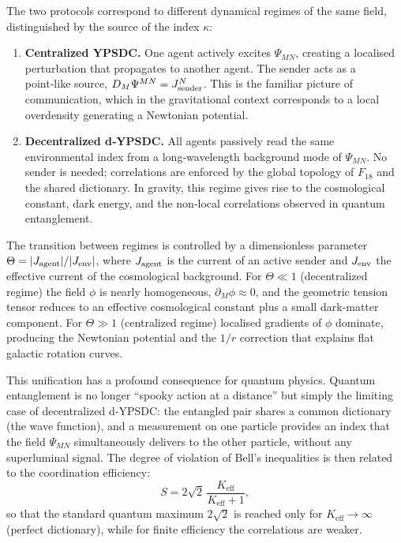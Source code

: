 \documentclass[12pt,a4paper]{article}
\begin{document}
	The two protocols correspond to different dynamical regimes of the same field,
	distinguished by the source of the index $\kappa$:
	\begin{enumerate}[leftmargin=*]
		\item \textbf{Centralized YPSDC.} One agent actively excites $\Psi_{MN}$,
		creating a localised perturbation that propagates to another agent. The
		sender acts as a point‑like source, $D_M\Psi^{MN} = J^N_{\rm sender}$.
		This is the familiar picture of communication, which in the gravitational
		context corresponds to a local overdensity generating a Newtonian potential.
		\item \textbf{Decentralized d‑YPSDC.} All agents passively read the same
		environmental index from a long‑wavelength background mode of $\Psi_{MN}$.
		No sender is needed; correlations are enforced by the global topology of
		$F_{18}$ and the shared dictionary. In gravity, this regime gives rise to
		the cosmological constant, dark energy, and the non‑local correlations
		observed in quantum entanglement.
	\end{enumerate}
	
	The transition between regimes is controlled by a dimensionless parameter
	$\Theta = |J_{\rm agent}| / |J_{\rm env}|$, where $J_{\rm agent}$ is the
	current of an active sender and $J_{\rm env}$ the effective current of the
	cosmological background. For $\Theta\ll1$ (decentralized regime) the field
	$\phi$ is nearly homogeneous, $\partial_M\phi\approx0$, and the geometric
	tension tensor reduces to an effective cosmological constant plus a small
	dark‑matter component. For $\Theta\gg1$ (centralized regime) localised
	gradients of $\phi$ dominate, producing the Newtonian potential and the
	$1/r$ correction that explains flat galactic rotation curves.
	
	This unification has a profound consequence for quantum physics.
	Quantum entanglement is no longer “spooky action at a distance” but simply
	the limiting case of decentralized d‑YPSDC: the entangled pair shares a
	common dictionary (the wave function), and a measurement on one particle
	provides an index that the field $\Psi_{MN}$ simultaneously delivers to the
	other particle, without any superluminal signal. The degree of violation of
	Bell’s inequalities is then related to the coordination efficiency:
	\begin{equation}
		S = 2\sqrt{2}\,\frac{K_{\mathrm{eff}}}{K_{\mathrm{eff}}+1},
		\label{eq:bell-eff}
	\end{equation}
	so that the standard quantum maximum $2\sqrt{2}$ is reached only for
	$K_{\mathrm{eff}}\to\infty$ (perfect dictionary), while for finite
	efficiency the correlations are weaker.
	
\end{document}

